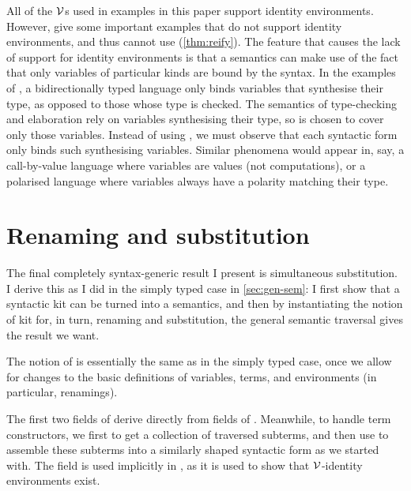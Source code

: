 All of the $\V$s used in examples in this paper support identity environments.
However, \citet[p.~27]{AACMM21} give some important examples that do not
support identity environments, and thus cannot use 
(\cref{thm:reify}).
The feature that causes the lack of support for identity environments is that
a semantics can make use of the fact that only variables of particular kinds
are bound by the syntax.
In the examples of \citeauthor{AACMM21}, a bidirectionally typed language only
binds variables that synthesise their type, as opposed to those whose type is
checked.
The semantics of type-checking and elaboration rely on variables synthesising
their type, so \AgdaBound{$\V$} is chosen to cover only those variables.
Instead of using , we must observe that each syntactic form
only binds such synthesising variables.
Similar phenomena would appear in, say, a call-by-value language where
variables are values (not computations), or a polarised language where
variables always have a polarity matching their type.

\section{Renaming and substitution}\label{sec:kit-to-sem}

The final completely syntax-generic result I present is simultaneous
substitution.
I derive this as I did in the simply typed case in \cref{sec:gen-sem}:
I first show that a syntactic kit can be turned into a semantics, and then by
instantiating the notion of kit for, in turn, renaming and substitution, the
general semantic traversal gives the result we want.

The notion of  is essentially the same as in the simply typed
case, once we allow for changes to the basic definitions of variables, terms,
and environments (in particular, renamings).


The first two fields of  derive directly from fields of
.
Meanwhile, to handle term constructors, we first  to get a
collection of traversed subterms, and then use 
to assemble these subterms into a similarly shaped syntactic form as we started
with.
The  field is used implicitly in , as it is
used to show that $\V$-identity environments exist.


